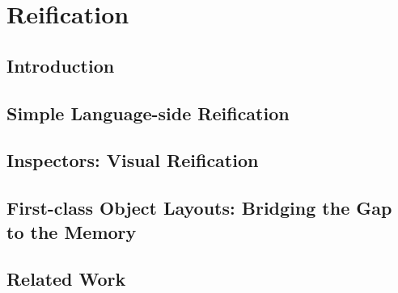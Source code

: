 
\chapter{Reification}
\minitoc

\section{Introduction}





\section{Simple Language-side Reification}





\section{Inspectors: Visual Reification}





\section{First-class Object Layouts: Bridging the Gap to the Memory}




\section{Related Work}

